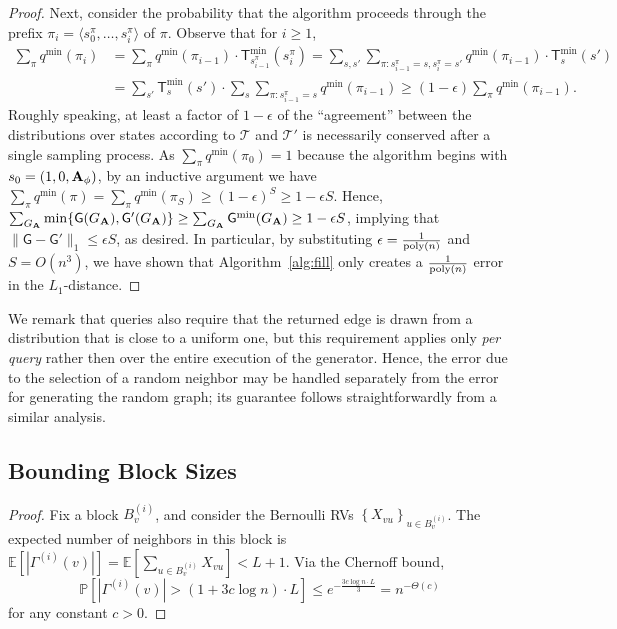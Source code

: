 \begin{proof}
Next, consider the probability that the algorithm proceeds through the prefix $\pi_i = \langle s^\pi_0, \ldots, s^\pi_{i}\rangle$ of $\pi$. Observe that for $i \geq 1$,
\begin{align*}\sum_{\pi} q^{\min}(\pi_i) &=\sum_{\pi} q^{\min}(\pi_{i-1})\cdot \mathsf{T}^{\min}_{s^\pi_{i-1}}(s^\pi_{i}) 
= \sum_{s,s'} \sum_{\pi:s^\pi_{i-1} = s,s^\pi_{i} = s'} q^{\min}(\pi_{i-1})\cdot \mathsf{T}^{\min}_{s}(s') \\
&= \sum_{s'} \mathsf{T}^{\min}_s(s')\cdot\sum_{s} \sum_{\pi:s^\pi_{i-1} = s} q^{\min}(\pi_{i-1})
\geq (1-\epsilon) \sum_{\pi} q^{\min}(\pi_{i-1}).\end{align*}
Roughly speaking, at least a factor of $1-\epsilon$ of the ``agreement'' between the distributions over states according to $\mathcal{T}$ and $\mathcal{T}'$ is necessarily conserved after a single sampling process. As $\sum_{\pi} q^{\min}(\pi_0)=1$ because the algorithm begins with $s_0 = (1, 0, \mathbf{A}_\phi)$, by an inductive argument we have $\sum_{\pi} q^{\min}(\pi)=\sum_{\pi} q^{\min}(\pi_S) \geq (1-\epsilon)^S \geq 1-\epsilon S$. Hence, $\sum_{G_{\mathbf{A}}} \min\{\mathsf{G}(G_{\mathbf{A}}),\mathsf{G}'(G_{\mathbf{A}})\} \geq \sum_{G_{\mathbf{A}}} \mathsf{G}^{\min}(G_{\mathbf{A}}) \geq 1-\epsilon S$, implying that $\|\mathsf{G}-\mathsf{G}'\|_1 \leq \epsilon S$, as desired. In particular,  by substituting $\epsilon = \frac{1}{\mathrm{poly}(n)}$ and $S = O(n^3)$, we have shown that Algorithm~\ref{alg:fill} only creates a $\frac{1}{\mathrm{poly}(n)}$ error in the $L_1$-distance. 
\end{proof}

We remark that  queries also require that the returned edge is drawn from a distribution that is close to a uniform one, but this requirement applies only \emph{per query} rather then over the entire execution of the generator. Hence, the error due to the selection of a random neighbor may be handled separately from the error for generating the random graph; its guarantee follows straightforwardly from a similar analysis.





\subsection{Bounding Block Sizes}\label{sec:bounding_block_sizes}
\MaxBlockSize*
\begin{proof}
Fix a block $B_v^{(i)}$, and consider the Bernoulli RVs $\left\{ X_{vu}\right\}_{u\in B_v^{(i)}}$.
The expected number of neighbors in this block is
$ \textstyle\mathbb{E} \left[ |\Gamma^{(i)}(v)| \right] =\mathbb{E} \left[ \sum_{u\in B_v^{(i)}} X_{vu} \right] < L+1$.
Via the Chernoff bound,
\[
\mathbb{P} \left[ |\Gamma^{(i)}(v)|> (1+3c\log n)\cdot L \right]
\le e^{-\frac{3c\log n\cdot L}{3}} = n^{-\Theta(c)}
\]
for any constant $c > 0$.
\end{proof}

